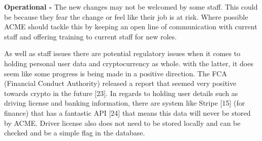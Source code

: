   \noindent\textbf{Operational -} The new changes may not be welcomed by some staff. This could be because they fear the change or feel like their job is at risk.
  Where possible ACME should tackle this by keeping an open line of communication with current staff and offering training to current staff for new roles.

  As well as staff issues there are potential regulatory issues when it comes to holding personal user data and cryptocurrency as whole. with the latter, it
  does seem like some progress is being made in a positive direction. The FCA (Financial Conduct Authority) released a report that seemed very positive
  towards crypto in the future [23]. In regards to holding user details such as driving license and banking information, there are system like Stripe [15] 
  (for finance) that has a fantastic API [24] that means this data will never be stored by ACME. Driver license also does not need to be stored locally and can be 
  checked and be a simple flag in the database.

\newpage